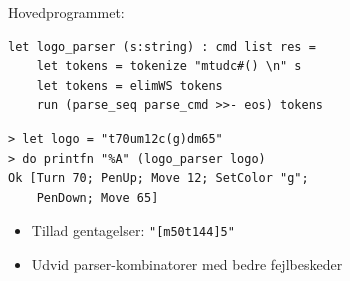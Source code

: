 \documentclass[rgb]{beamer}
\begin{document}
\begin{frame}[fragile]
\begin{footnotesize}

  Hovedprogrammet:

\begin{lstlisting}[numbers=none,frame=none,mathescape]
  let logo_parser (s:string) : cmd list res =
    let tokens = tokenize "mtudc#() \n" s
    let tokens = elimWS tokens
    run (parse_seq parse_cmd >>- eos) tokens
\end{lstlisting}

\begin{minipage}[b]{0.7\textwidth}

\begin{lstlisting}[numbers=none,frame=none,mathescape]
> let logo = "t70um12c(g)dm65"
> do printfn "%A" (logo_parser logo)
Ok [Turn 70; PenUp; Move 12; SetColor "g";
    PenDown; Move 65]
\end{lstlisting}

\begin{itemize}
\item Tillad gentagelser: \lstinline{"[m50t144]5"}

\item Udvid parser-kombinatorer med bedre fejlbeskeder
\end{itemize}
\end{minipage} \hspace{5mm}
\begin{minipage}[b]{0.2\textwidth}


\end{minipage}
\end{footnotesize}
\end{frame}
\end{document}
